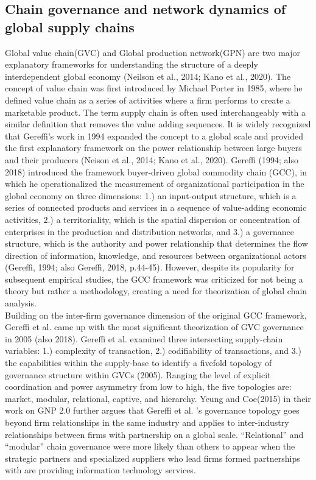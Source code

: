 \documentclass[12pt]{article}
\begin{document}
    \subsection*{\centering Chain governance and network dynamics of global supply chains} 
\textbf{}
\indent Global value chain(GVC) and Global production network(GPN) are two major explanatory frameworks for understanding the structure of a deeply interdependent global economy (Neilson et al., 2014; Kano et al., 2020). The concept of value chain was first introduced by Michael Porter in 1985, where he defined value chain as a series of activities where a firm performs to create a marketable product. The term supply chain is often used interchangeably with a similar definition that removes the value adding sequences. It is widely recognized that Gereffi’s work in 1994 expanded the concept to a global scale and provided the first explanatory framework on the power relationship between large buyers and their producers (Neison et al., 2014; Kano et al., 2020). Gereffi (1994; also 2018) introduced the framework buyer-driven global commodity chain (GCC), in which he operationalized the measurement of organizational participation in the global economy on three dimensions: 1.) an input-output structure, which is a series of connected products and services in a sequence of value-adding economic activities, 2.) a territoriality, which is the spatial dispersion or concentration of enterprises in the production and distribution networks, and 3.) a governance structure, which is the authority and power relationship that determines the flow direction of information, knowledge, and resources between organizational actors (Gereffi, 1994; also Gereffi, 2018, p.44-45). However, despite its popularity for subsequent empirical studies, the GCC framework was criticized for not being a theory but rather a methodology, creating a need for theorization of global chain analysis.\\
\indent Building on the inter-firm governance dimension of the original GCC framework, Gereffi et al. came up with the most significant theorization of GVC governance in 2005 (also 2018). Gereffi et al. examined three intersecting supply-chain variables: 1.) complexity of transaction, 2.) codifiability of transactions, and 3.) the capabilities within the supply-base to identify a fivefold topology of governance structure within GVCs (2005). Ranging the level of explicit coordination and power asymmetry from low to high, the five topologies are: market, modular, relational, captive, and hierarchy. Yeung and Coe(2015) in their work on GNP 2.0 further argues that Gereffi et al. 's governance topology goes beyond firm relationships in the same industry and applies to inter-industry relationships between firms with partnership on a global scale. “Relational” and “modular” chain governance were more likely than others to appear when the strategic partners and specialized suppliers who lead firms formed partnerships with are providing information technology services.\\
\end{document}
